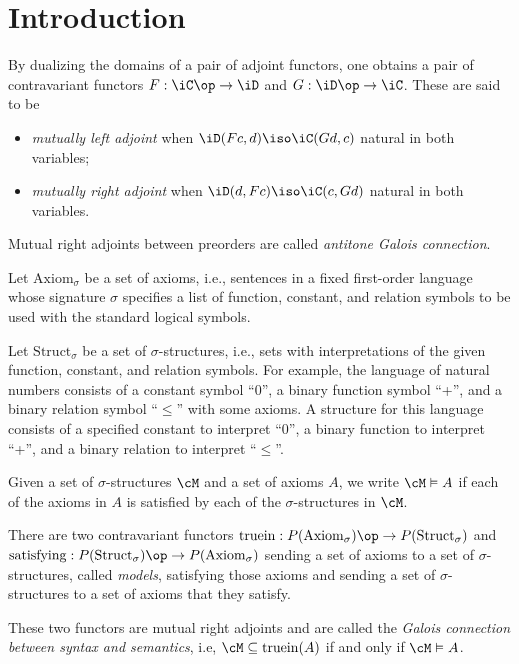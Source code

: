 \documentclass{amsart}
\title{}
\author{Frank Tsai}
\date{\today}
\begin{document}
\maketitle
\tableofcontents

\section{Introduction}
\label{sec:introduction}

\begin{defn}
  By dualizing the domains of a pair of adjoint functors, one obtains a pair of contravariant functors $F : \iC\op \to \iD$ and $G : \iD\op \to \iC$.
  These are said to be
  \begin{itemize}
  \item \emph{mutually left adjoint} when $\iD(Fc, d) \iso \iC(Gd, c)$ natural in both variables;
  \item \emph{mutually right adjoint} when $\iD(d, Fc) \iso \iC(c, Gd)$ natural in both variables. 
  \end{itemize}
\end{defn}

Mutual right adjoints between preorders are called \emph{antitone Galois connection}.

\begin{eg}
  Let $\mathrm{Axiom}_{\sigma}$ be a set of axioms, i.e., sentences in a fixed first-order language whose signature $\sigma$ specifies a list of function, constant, and relation symbols to be used with the standard logical symbols.

  Let $\mathrm{Struct}_{\sigma}$ be a set of $\sigma$-structures, i.e., sets with interpretations of the given function, constant, and relation symbols.
  For example, the language of natural numbers consists of a constant symbol ``0'', a binary function symbol ``+'', and a binary relation symbol ``$\leq$'' with some axioms.
  A structure for this language consists of a specified constant to interpret ``0'', a binary function to interpret ``+'', and a binary relation to interpret ``$\leq$''.

  Given a set of $\sigma$-structures $\cM$ and a set of axioms $A$, we write $\cM \vDash A$ if each of the axioms in $A$ is satisfied by each of the $\sigma$-structures in $\cM$.

  There are two contravariant functors $\mathrm{truein} : P(\mathrm{Axiom}_{\sigma})\op \to P(\mathrm{Struct}_{\sigma})$ and $\mathrm{satisfying} : P(\mathrm{Struct}_{\sigma})\op \to P(\mathrm{Axiom}_{\sigma})$ sending a set of axioms to a set of $\sigma$-structures, called \emph{models}, satisfying those axioms and sending a set of $\sigma$-structures to a set of axioms that they satisfy.

  These two functors are mutual right adjoints and are called the \emph{Galois connection between syntax and semantics}, i.e, $\cM \subseteq \mathrm{truein}(A)$ if and only if $\cM \vDash A$.
\end{eg}



\end{document}
